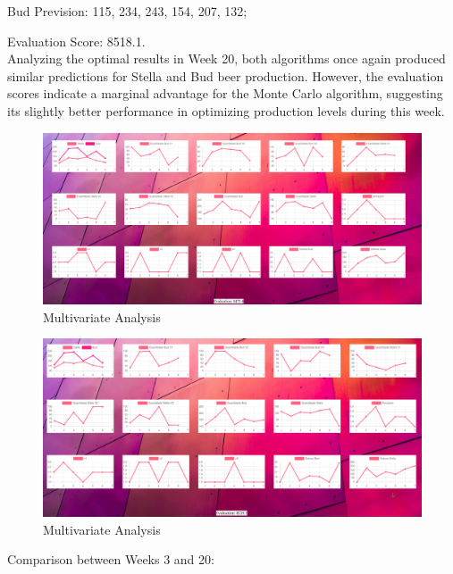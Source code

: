 \quad \quad \textbullet Bud Prevision: 115, 234, 243, 154, 207, 132;

\quad \quad \textbullet Evaluation Score: 8518.1.\\

Analyzing the optimal results in Week 20, both algorithms once again produced similar predictions for Stella and Bud beer production. However, the evaluation scores indicate a marginal advantage for the Monte Carlo algorithm, suggesting its slightly better performance in optimizing production levels during this week.




\begin{figure}[H]
    \centering
    \includegraphics[width=1\textwidth]{assets/oo3.jpeg}
    \caption{Multivariate Analysis}
    \label{fig:mulivariate_dataset}
    \end{figure}


\begin{figure}[H]
    \centering
    \includegraphics[width=1\textwidth]{assets/oo4.jpeg}
    \caption{Multivariate Analysis}
    \label{fig:mulivariate_dataset}
    \end{figure}



Comparison between Weeks 3 and 20:\\

